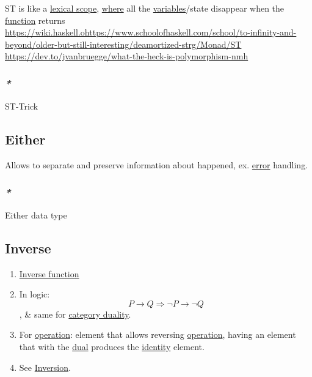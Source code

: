 \documentclass[11pt]{article}
\begin{document}
ST is like a \hyperref[org8fb06f5]{lexical scope}, \hyperref[orgefd1ecd]{where} all the \hyperref[orgd3f3ade]{variables}/state disappear when the \hyperref[orgeb5cddb]{function} returns\\
\url{https://wiki.haskell.ohttps://www.schoolofhaskell.com/school/to-infinity-and-beyond/older-but-still-interesting/deamortized-strg/Monad/ST}\\
\url{https://dev.to/jvanbruegge/what-the-heck-is-polymorphism-nmh}\\

\subsubsection{\emph{*}}
\label{sec:orgead3870}

\label{org17bfb25}ST-Trick\\

\subsection{\label{orgbc5fdf7}Either}
\label{sec:org8135100}

Allows to separate and preserve information about happened, ex. \hyperref[orgb69b647]{error} handling.\\

\subsubsection{\emph{*}}
\label{sec:orge75de3a}

\label{org56a0b82}Either data type\\

\subsection{\label{org41275e7}Inverse}
\label{sec:org56d7dcd}

\begin{enumerate}
\item \hyperref[org47c04f0]{Inverse function}\\

\item In logic: $$ P \to Q \Rightarrow \neg P \to \neg Q $$, \& same for \hyperref[orge0bc871]{category duality}.\\

\item For \hyperref[org87d485b]{operation}: element that allows reversing \hyperref[org87d485b]{operation}, having an element that with the \hyperref[org0a6da4c]{dual} produces the \hyperref[org3bbbadd]{identity} element.\\

\item See \hyperref[orgc8ca7a2]{Inversion}.\\
\end{enumerate}
\end{document}
